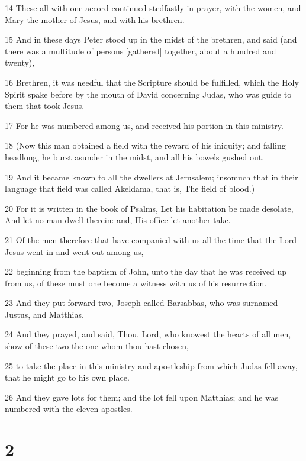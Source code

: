 \par 14 These all with one accord continued stedfastly in prayer, with the women, and Mary the mother of Jesus, and with his brethren.
\par 15 And in these days Peter stood up in the midst of the brethren, and said (and there was a multitude of persons [gathered] together, about a hundred and twenty),
\par 16 Brethren, it was needful that the Scripture should be fulfilled, which the Holy Spirit spake before by the mouth of David concerning Judas, who was guide to them that took Jesus.
\par 17 For he was numbered among us, and received his portion in this ministry.
\par 18 (Now this man obtained a field with the reward of his iniquity; and falling headlong, he burst asunder in the midst, and all his bowels gushed out.
\par 19 And it became known to all the dwellers at Jerusalem; insomuch that in their language that field was called Akeldama, that is, The field of blood.)
\par 20 For it is written in the book of Psalms, Let his habitation be made desolate, And let no man dwell therein: and, His office let another take.
\par 21 Of the men therefore that have companied with us all the time that the Lord Jesus went in and went out among us,
\par 22 beginning from the baptism of John, unto the day that he was received up from us, of these must one become a witness with us of his resurrection.
\par 23 And they put forward two, Joseph called Barsabbas, who was surnamed Justus, and Matthias.
\par 24 And they prayed, and said, Thou, Lord, who knowest the hearts of all men, show of these two the one whom thou hast chosen,
\par 25 to take the place in this ministry and apostleship from which Judas fell away, that he might go to his own place.
\par 26 And they gave lots for them; and the lot fell upon Matthias; and he was numbered with the eleven apostles.

\chapter{2}

